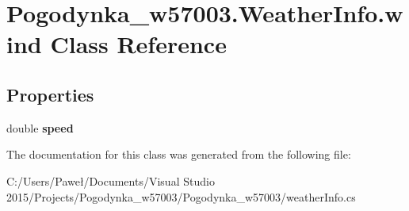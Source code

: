 \hypertarget{class_pogodynka__w57003_1_1_weather_info_1_1wind}{}\section{Pogodynka\+\_\+w57003.\+Weather\+Info.\+wind Class Reference}
\label{class_pogodynka__w57003_1_1_weather_info_1_1wind}
\subsection*{Properties}
\begin{DoxyCompactItemize}
\item 
\mbox{\label{class_pogodynka__w57003_1_1_weather_info_1_1wind_a5daace24b18b430d76a439ec5c8b3bb9}} 
double {\bfseries speed}
\end{DoxyCompactItemize}


The documentation for this class was generated from the following file\+:\begin{DoxyCompactItemize}
\item 
C\+:/\+Users/\+Paweł/\+Documents/\+Visual Studio 2015/\+Projects/\+Pogodynka\+\_\+w57003/\+Pogodynka\+\_\+w57003/weather\+Info.\+cs\end{DoxyCompactItemize}
